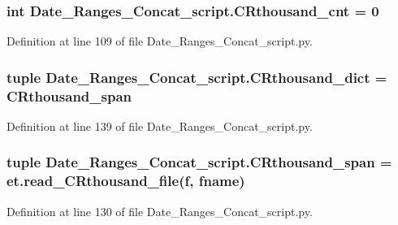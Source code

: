 \subsubsection[{C\+Rthousand\+\_\+cnt}]{\setlength{\rightskip}{0pt plus 5cm}int Date\+\_\+\+Ranges\+\_\+\+Concat\+\_\+script.\+C\+Rthousand\+\_\+cnt = 0}\label{namespace_date___ranges___concat__script_abb2bf9b40692c8d7be5ca5538b9b5149}


Definition at line 109 of file Date\+\_\+\+Ranges\+\_\+\+Concat\+\_\+script.\+py.

\hypertarget{namespace_date___ranges___concat__script_ad95c3578d6bdd82cd9b4c84a0f09d26d}{}
\subsubsection[{C\+Rthousand\+\_\+dict}]{\setlength{\rightskip}{0pt plus 5cm}tuple Date\+\_\+\+Ranges\+\_\+\+Concat\+\_\+script.\+C\+Rthousand\+\_\+dict = {\bf C\+Rthousand\+\_\+span}}\label{namespace_date___ranges___concat__script_ad95c3578d6bdd82cd9b4c84a0f09d26d}


Definition at line 139 of file Date\+\_\+\+Ranges\+\_\+\+Concat\+\_\+script.\+py.

\hypertarget{namespace_date___ranges___concat__script_a78202928a38556bf4ca275bd38d154de}{}
\subsubsection[{C\+Rthousand\+\_\+span}]{\setlength{\rightskip}{0pt plus 5cm}tuple Date\+\_\+\+Ranges\+\_\+\+Concat\+\_\+script.\+C\+Rthousand\+\_\+span = et.\+read\+\_\+\+C\+Rthousand\+\_\+file({\bf f}, fname)}\label{namespace_date___ranges___concat__script_a78202928a38556bf4ca275bd38d154de}


Definition at line 130 of file Date\+\_\+\+Ranges\+\_\+\+Concat\+\_\+script.\+py.

\hypertarget{namespace_date___ranges___concat__script_aeb5f665fdd491d07f2d8b61e3fe81752}{}
